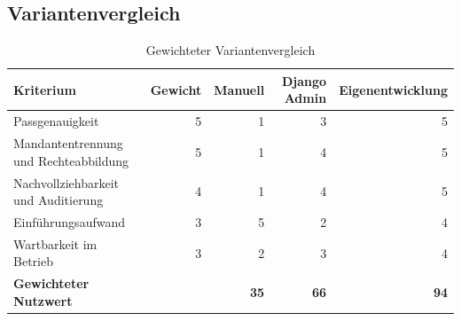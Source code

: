 \subsection{Variantenvergleich}
\label{app:Variantenvergleich}
\begin{table}[htbp]
\centering
\begin{tabular}{|p{4.0cm}|r|r|r|r|}
\hline
\textbf{Kriterium} & \textbf{Gewicht} & \textbf{Manuell} & \textbf{Django Admin} & \textbf{Eigenentwicklung} \\
\hline
Passgenauigkeit & 5 & 1 & 3 & 5 \\
\hline
Mandantentrennung und Rechteabbildung & 5 & 1 & 4 & 5 \\
\hline
Nachvollziehbarkeit und Auditierung & 4 & 1 & 4 & 5 \\
\hline
Einführungsaufwand & 3 & 5 & 2 & 4 \\
\hline
Wartbarkeit im Betrieb & 3 & 2 & 3 & 4 \\
\hline
\textbf{Gewichteter Nutzwert} & & \textbf{35} & \textbf{66} & \textbf{94} \\
\hline
\end{tabular}
\caption{Gewichteter Variantenvergleich}
\end{table}
